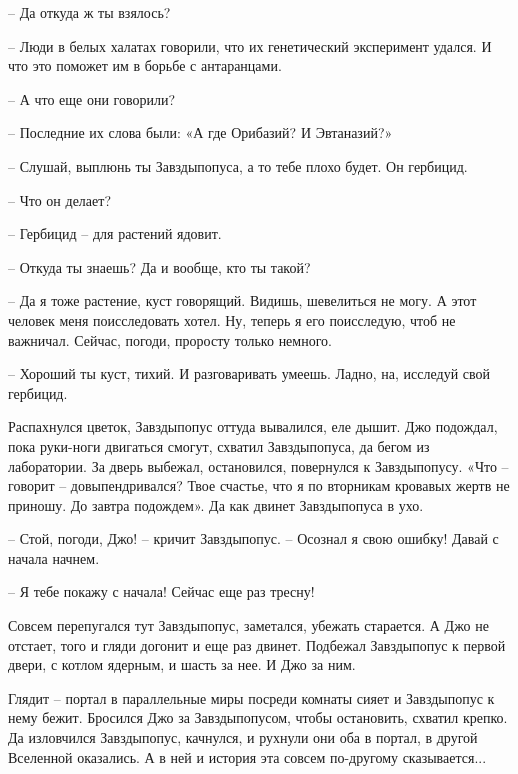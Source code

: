 \documentclass[ebook,oneside,final,openright]{memoir}
\begin{document}
– Да откуда ж ты взялось?\par
– Люди в белых халатах говорили, что их генетический эксперимент удался. И что это поможет им в борьбе с антаранцами.\par
– А что еще они говорили?\par
– Последние их слова были: «А где Орибазий? И Эвтаназий?»\par
– Слушай, выплюнь ты Завздыпопуса, а то тебе плохо будет. Он гербицид.\par
– Что он делает?\par
– Гербицид – для растений ядовит.\par
– Откуда ты знаешь? Да и вообще, кто ты такой?\par
– Да я тоже растение, куст говорящий. Видишь, шевелиться не могу. А этот человек меня поисследовать хотел. Ну, теперь я его поисследую, чтоб не важничал. Сейчас, погоди, проросту только немного.\par
– Хороший ты куст, тихий. И разговаривать умеешь. Ладно, на, исследуй свой гербицид.\par
\par
Распахнулся цветок, Завздыпопус оттуда вывалился, еле дышит. Джо подождал, пока руки-ноги двигаться смогут, схватил Завздыпопуса, да бегом из лаборатории. За дверь выбежал, остановился, повернулся к Завздыпопусу. «Что – говорит – довыпендривался? Твое счастье, что я по вторникам кровавых жертв не приношу. До завтра подождем». Да как двинет Завздыпопуса в ухо.\par
\par
– Стой, погоди, Джо! – кричит Завздыпопус. – Осознал я свою ошибку! Давай с начала начнем.\par
– Я тебе покажу с начала! Сейчас еще раз тресну!\par
\par
Совсем перепугался тут Завздыпопус, заметался, убежать старается. А Джо не отстает, того и гляди догонит и еще раз двинет. Подбежал Завздыпопус к первой двери, с котлом ядерным, и шасть за нее. И Джо за ним.\par
\par
Глядит – портал в параллельные миры посреди комнаты сияет и Завздыпопус к нему бежит. Бросился Джо за Завздыпопусом, чтобы остановить, схватил крепко. Да изловчился Завздыпопус, качнулся, и рухнули они оба в портал, в другой Вселенной оказались. А в ней и история эта совсем по-другому сказывается...\par
\end{document}
